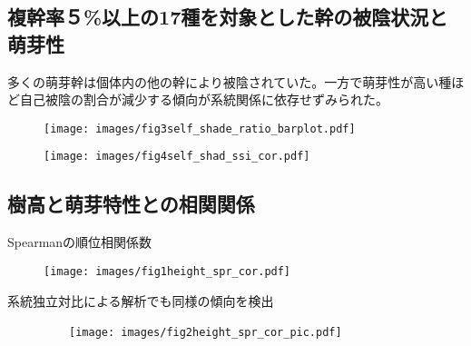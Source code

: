 \documentclass[a0, 30pt, plainboxedsections]{sciposter} %
\renewcommand{\baselinestretch}{1.2}
\begin{document}
\begin{multicols}{2}
\begin{mdframed}[style=subsection.frame,frametitle={\textbf{\color{Black1}{\LARGE{\ding{192}}\Large{25種の株構造は種間で大きく異なる}}}}]
\end{mdframed}

\renewcommand{\baselinestretch}{0.8}
\begin{mdframed}[style=subsection.frame,frametitle=\textbf{\color{Black1}{\LARGE{\ding{194}}\Large{萌芽性が強い種ほど自己被陰率が下がる}}}]
\renewcommand{\baselinestretch}{1.2}

\subsection*{複幹率５\%以上の17種を対象とした幹の被陰状況と萌芽性}

多くの萌芽幹は個体内の他の幹により被陰されていた。一方で萌芽性が高い種ほど自己被陰の割合が減少する傾向が系統関係に依存せずみられた。

\begin{figure}
 \begin{minipage}{0.5\hsize}
  \centering
   \texttt{[image: images/fig3self\_shade\_ratio\_barplot.pdf]} %
 \end{minipage}
 \begin{minipage}{0.5\hsize}
  \centering
   \texttt{[image: images/fig4self\_shad\_ssi\_cor.pdf]}
 \end{minipage}
\end{figure}

\end{mdframed}

\columnbreak
\renewcommand{\baselinestretch}{0.8}
\begin{mdframed}[style=subsection.frame,frametitle=\textbf{\color{Black1}{\LARGE{\ding{193}}\Large{樹高が高くなるほど萌芽性が強くなる}}}]
\renewcommand{\baselinestretch}{1.2} %

\subsection*{樹高と萌芽特性との相関関係}

Spearmanの順位相関係数

\begin{figure}
	\centering
		\texttt{[image: images/fig1height\_spr\_cor.pdf]} %
\end{figure}

系統独立対比による解析でも同様の傾向を検出

\begin{figure}
	\centering\hspace{-2em}
	　　\texttt{[image: images/fig2height\_spr\_cor\_pic.pdf]}
\end{figure}

\end{mdframed}

\end{multicols}

\end{document}
